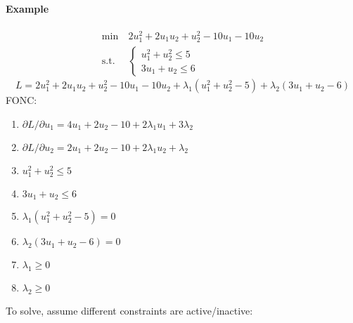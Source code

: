 \documentclass[letterpaper,12pt,titlepage]{report}
\theoremstyle{plain}
\theoremstyle{definition}
\begin{document}
\paragraph{Example}
\begin{align}
  \min {}\ & 2u_1^2 + 2u_1u_2 + u_2^2 - 10u_1 - 10u_2 \\
  \text{s.t. } & \begin{cases}
    u_1^2 + u_2^2 \le 5 \\
    3u_1 + u_2 \le 6
  \end{cases}
\end{align}
\[ L = 2u_1^2 + 2u_1u_2 + u_2^2 - 10u_1 - 10u_2 + \lambda_1 (u_1^2 + u_2^2 - 5) + \lambda_2 (3u_1+u_2 - 6) \]
FONC:
\begin{enumerate}[label=\roman*)]
\item $\partial L/\partial u_1 = 4u_1 + 2u_2 - 10 + 2\lambda_1u_1 + 3\lambda_2$
\item $\partial L/\partial u_2 = 2u_1 + 2u_2 - 10 + 2\lambda_1u_2 + \lambda_2$
\item $u_1^2 + u_2^2 \le 5$
\item $3u_1 + u_2 \le 6$
\item $\lambda_1(u_1^2 + u_2^2 - 5) = 0$
\item $\lambda_2(3u_1 + u_2 - 6) = 0$
\item $\lambda_1 \ge 0$
\item $\lambda_2 \ge 0$
\end{enumerate}
To solve, assume different constraints are active/inactive:
\end{document}
